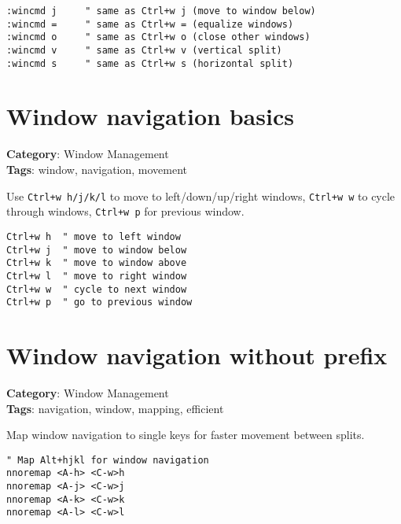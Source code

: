 {{{{{{{{{{{{{{{{{{\begin{Exa*}{}
\begin{Verbatim}[fontsize=\footnotesize, breaklines, breakanywhere]
:wincmd j     " same as Ctrl+w j (move to window below)
:wincmd =     " same as Ctrl+w = (equalize windows)
:wincmd o     " same as Ctrl+w o (close other windows)
:wincmd v     " same as Ctrl+w v (vertical split)
:wincmd s     " same as Ctrl+w s (horizontal split)
\end{Verbatim}
\end{Exa*}

\section{Window navigation basics}

\textbf{Category}: Window Management\\ \textbf{Tags}: window, navigation, movement
\vspace{0.5cm}

Use {\footnotesize \Verb§Ctrl+w h/j/k/l§} to move to left/down/up/right windows, {\footnotesize \Verb§Ctrl+w w§} to cycle through windows, {\footnotesize \Verb§Ctrl+w p§} for previous window.

\begin{Exa*}{}
\begin{Verbatim}[fontsize=\footnotesize, breaklines, breakanywhere]
Ctrl+w h  " move to left window
Ctrl+w j  " move to window below
Ctrl+w k  " move to window above
Ctrl+w l  " move to right window
Ctrl+w w  " cycle to next window
Ctrl+w p  " go to previous window
\end{Verbatim}
\end{Exa*}

\section{Window navigation without prefix}

\textbf{Category}: Window Management\\ \textbf{Tags}: navigation, window, mapping, efficient
\vspace{0.5cm}

Map window navigation to single keys for faster movement between splits.

\begin{Exa*}{}
\begin{Verbatim}[fontsize=\footnotesize, breaklines, breakanywhere]
" Map Alt+hjkl for window navigation
nnoremap <A-h> <C-w>h
nnoremap <A-j> <C-w>j
nnoremap <A-k> <C-w>k
nnoremap <A-l> <C-w>l


\end{Verbatim}
\end{Exa*}}}}}}}}}}}}}}}}}}}
